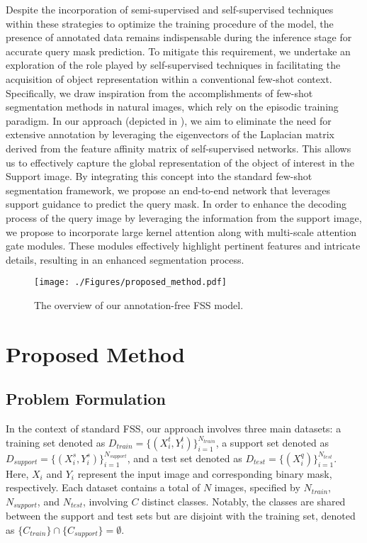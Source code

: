 \documentclass[runningheads]{llncs}
\begin{document}
Despite the incorporation of semi-supervised and self-supervised techniques within these strategies to optimize the training procedure of the model, the presence of annotated data remains indispensable during the inference stage for accurate query mask prediction. To mitigate this requirement, we undertake an exploration of the role played by self-supervised techniques in facilitating the acquisition of object representation within a conventional few-shot context. Specifically, we draw inspiration from the accomplishments of few-shot segmentation methods in natural images, which rely on the episodic training paradigm. In our approach (depicted in ),  we aim to eliminate the need for extensive annotation by leveraging the eigenvectors of the Laplacian matrix derived from the feature affinity matrix of self-supervised networks. This allows us to effectively capture the global representation of the object of interest in the Support image. By integrating this concept into the standard few-shot segmentation framework,  we propose an end-to-end network that leverages support guidance to predict the query mask. In order to enhance the decoding process of the query image by leveraging the information from the support image,  we propose to incorporate large kernel attention along with multi-scale attention gate modules. These modules effectively highlight pertinent features and intricate details, resulting in an enhanced segmentation process.

\begin{figure}[!th]
    \centering
    \texttt{[image: ./Figures/proposed\_method.pdf]}
    \caption{The overview of our annotation-free FSS model.}
    \label{fig:proposed-method}
\end{figure}

\section{Proposed Method} 
\subsection{Problem Formulation}
\label{subsec:problem}
In the context of standard FSS, our approach involves three main datasets: a training set denoted as $D_{train}=\{{(X_i^t,Y_i^t)}\}_{i=1}^{N_{train}}$, a support set denoted as $D_{support}=\{{(X_i^s,Y_i^s)}\}_{i=1}^{N_{support}}$, and a test set denoted as $D_{test}=\{{(X_i^q)}\}_{i=1}^{N_{test}}$. Here, $X_i$ and $Y_i$ represent the input image and corresponding binary mask, respectively. Each dataset contains a total of $N$ images, specified by $N_{train}$, $N_{support}$, and $N_{test}$, involving $C$ distinct classes. Notably, the classes are shared between the support and test sets but are disjoint with the training set, denoted as $\{C_{train}\} \cap \{C_{support}\}=\emptyset$.
\end{document}

